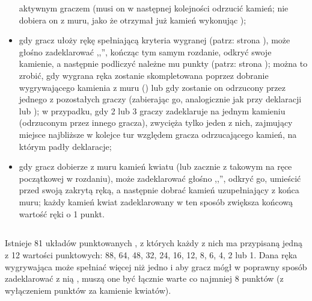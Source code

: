 \begin{itemize}
  aktywnym graczem (musi on w następnej kolejności odrzucić kamień; nie dobiera
  on z muru, jako że otrzymał już kamień wykonując );
  \item {}
  gdy gracz ułoży rękę spełniającą kryteria wygranej (patrz: strona
  \pageref{wygrywajacareka}), może głośno zadeklarować ,,'', kończąc
  tym samym rozdanie, odkryć swoje kamienie, a następnie podliczyć należne mu punkty
  (patrz: strona \pageref{punktacja}); można to zrobić, gdy wygrana ręka
  zostanie skompletowana poprzez dobranie wygrywającego kamienia z muru
  () lub gdy zostanie on odrzucony przez jednego z pozostałych
  graczy (zabierając go, analogicznie jak przy deklaracji  lub
  ); w przypadku, gdy 2 lub 3 graczy zadeklaruje  na
  jednym kamieniu (odrzuconym przez innego gracza), zwycięża tylko jeden z nich,
  zajmujący miejsce najbliższe w kolejce tur względem gracza odrzucającego
  kamień, na którym padły deklaracje;
  \item {}
  gdy gracz dobierze z muru kamień kwiatu (lub zacznie z takowym na ręce
  początkowej w rozdaniu), może zadeklarować głośno ,,'', odkryć
  go, umieścić przed swoją zakrytą ręką, a następnie dobrać kamień uzupełniający
  z końca muru; każdy kamień kwiat zadeklarowany w ten sposób zwiększa końcową
  wartość ręki o 1 punkt.
\end{itemize}

\subsection{}
\label{fan}
Istnieje 81 układów punktowanych , z których każdy z nich ma
przypisaną jedną z 12 wartości punktowych: 88, 64, 48, 32, 24, 16, 12, 8, 6, 4,
2 lub 1. Dana ręka
wygrywająca może spełniać więcej niż jedno  i aby gracz mógł w
poprawny sposób zadeklarować z nią , muszą one być łącznie warte co
najmniej 8 punktów (z wyłączeniem punktów za kamienie kwiatów).


